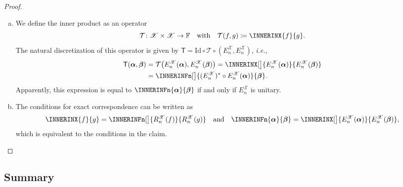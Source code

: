 \documentclass[a4paper]{paper}
\newcommand*{\SPC}[1]{{\ensuremath{\mathscr{#1}}}}
\newcommand*{\SPCX}{\SPC{X}}
\newcommand{\FIELD}{{\ensuremath{\mathbb{F}}}}
\newcommand*{\OP}[1]{{\ensuremath{\mathcal{#1}}}}
\newcommand*{\OPT}{\OP{T}}
\newcommand*{\OPID}{\OP{\mathrm{Id}}}
\newcommand{\DISCOP}[1]{{\ensuremath{\mathsf{#1}}}}
\newcommand*{\DISCOPT}{\DISCOP{T}}
\newcommand*{\EXT}[2]{\ensuremath{E_{#1}^{#2}}}
\newcommand*{\REST}[2]{\ensuremath{R_{#1}^{#2}}}
\newcommand*{\RnX}{{\ensuremath{\REST{n}{\SPC{X}}}}}
\newcommand*{\EnX}{{\ensuremath{\EXT{n}{\SPC{X}}}}}
\newcommand{\ie}{\textsl{i.e.}\xspace}
\newcommand{\valpha}{\boldsymbol{\alpha}}
\newcommand{\vbeta}{\boldsymbol{\beta}}
\begin{document}
\begin{proof}~
 \begin{enumerate}[(a)]
  \item We define the inner product as an operator
  \begin{equation*}
   \OPT \colon \SPCX \times \SPCX \to \FIELD
   \quad \text{with} \quad
   \OPT(f, g) \coloneqq  \INNERINX{f}{g}.
  \end{equation*}
  The natural discretization of this operator is given by $\DISCOPT = \OPID \circ \OPT \circ (\EnX, \EnX)$, \ie,
  \begin{align*}
   \DISCOPT(\valpha, \vbeta) 
   &= \OPT\big( \EnX(\valpha), \EnX(\vbeta) \big) 
   = \INNERINX[\big]{\EnX(\valpha)}{\EnX(\vbeta)} \\
   &= \INNERINFn[\big]{(\EnX)^* \circ \EnX(\valpha)}{\vbeta}.
  \end{align*}
  Apparently, this expression is equal to $\INNERINFn{\valpha}{\vbeta}$ if and only if $\EnX$ is unitary.

  \item The conditions for exact correspondence can be written as
  \begin{equation*}
   \INNERINX{f}{g} = \INNERINFn[\big]{\RnX(f)}{\RnX(g)}
   \quad \text{and} \quad
   \INNERINFn{\valpha}{\vbeta} = \INNERINX[\big]{\EnX(\valpha)}{\EnX(\vbeta)},
  \end{equation*}
  which is equivalent to the conditions in the claim.
 \end{enumerate}
\end{proof}



\subsection{Summary}
\label{subsec:prop:summary}
\end{document}
